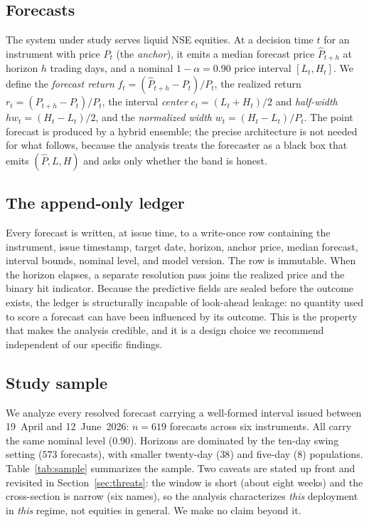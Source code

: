 \documentclass[11pt,a4paper]{article}
\begin{document}
\subsection{Forecasts}
The system under study serves liquid NSE equities. At a decision time $t$ for an
instrument with price $P_t$ (the \emph{anchor}), it emits a median forecast price
$\hat{P}_{t+h}$ at horizon $h$ trading days, and a nominal $1-\alpha = 0.90$ price
interval $[L_t, H_t]$. We define the \emph{forecast return}
$f_t = (\hat{P}_{t+h}-P_t)/P_t$, the realized return $r_t=(P_{t+h}-P_t)/P_t$, the
interval \emph{center} $c_t=(L_t+H_t)/2$ and \emph{half-width}
$\mathit{hw}_t=(H_t-L_t)/2$, and the \emph{normalized width} $w_t=(H_t-L_t)/P_t$.
The point forecast is produced by a hybrid ensemble; the precise architecture is not
needed for what follows, because the analysis treats the forecaster as a black box that
emits $(\hat P, L, H)$ and asks only whether the band is honest.

\subsection{The append-only ledger}
Every forecast is written, at issue time, to a write-once row containing the
instrument, issue timestamp, target date, horizon, anchor price, median forecast,
interval bounds, nominal level, and model version. The row is immutable. When the
horizon elapses, a separate resolution pass joins the realized price and the binary
hit indicator. Because the predictive fields are sealed before the outcome exists,
the ledger is structurally incapable of look-ahead leakage: no quantity used to score
a forecast can have been influenced by its outcome. This is the property that makes
the analysis credible, and it is a design choice we recommend independent of our
specific findings.

\subsection{Study sample}
We analyze every resolved forecast carrying a well-formed interval issued between
19~April and 12~June~2026: $n=619$ forecasts across six instruments. All carry the
same nominal level ($0.90$). Horizons are dominated by the ten-day swing setting
($573$ forecasts), with smaller twenty-day ($38$) and five-day ($8$) populations.
Table~\ref{tab:sample} summarizes the sample. Two caveats are stated up front and
revisited in Section~\ref{sec:threats}: the window is short (about eight weeks) and
the cross-section is narrow (six names), so the analysis characterizes \emph{this}
deployment in \emph{this} regime, not equities in general. We make no claim beyond it.
\end{document}
